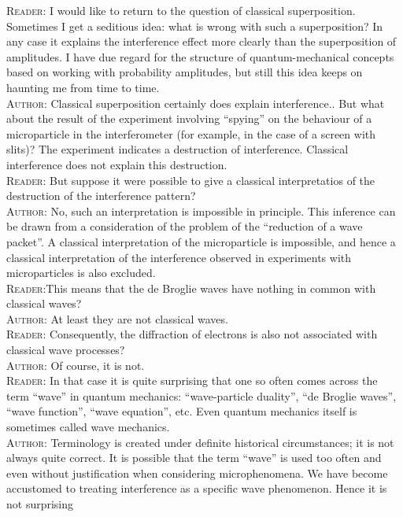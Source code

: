 \documentclass[a4paper,sfsidenotes,colorlinks=true]{tufte-book}
\numberwithin{equation}{section}
\numberwithin{figure}{section}
\begin{document}
\textsc{Reader}: I  would like to return to the question of classical
superposition. Sometimes I get a seditious idea: what is wrong with
such a superposition? In any case it explains the interference effect
more clearly than the superposition of amplitudes. I have due regard
for the structure of quantum-mechanical concepts based on working with
probability amplitudes, but still this idea keeps on haunting me from
time to time.
\\
\textsc{Author}: Classical superposition certainly does explain
interference.. But what about the result of the experiment involving
``spying'' on the behaviour of a microparticle in the interferometer
(for example, in the case of a screen with slits)? The experiment
indicates a destruction of interference. Classical interference does
not explain this destruction.
\\
\textsc{Reader}: But suppose it were possible to give a classical
interpretatios of the destruction of the interference pattern?
\\
\textsc{Author}: No, such an interpretation is impossible in
principle. This inference can be drawn from a consideration of the
problem of the ``reduction of a wave packet''. A classical
interpretation of the microparticle is impossible, and hence a
classical interpretation of the interference observed in experiments
with microparticles is also excluded.
\\
\textsc{Reader}:This means that the de Broglie waves have nothing in
common with classical waves?
\\
\textsc{Author}: At least they are not classical waves.
\\
\textsc{Reader}: Consequently, the diffraction of electrons is also
not associated with classical wave processes?
\\
\textsc{Author}: Of course, it is not.
\\
\textsc{Reader}: In that case it is quite surprising that one so often
comes across the term ``wave'' in quantum mechanics: ``wave-particle
duality'', ``de Broglie waves'', ``wave function'', ``wave equation'',
etc. Even quantum mechanics itself is sometimes called wave mechanics.
\\
\textsc{Author}: Terminology is created under definite historical
circumstances; it is not always quite correct. It is possible that the
term ``wave'' is used too often and even without justification when
considering microphenomena. We have become accustomed to treating
interference as a specific wave phenomenon. Hence it is not surprising
\end{document}
